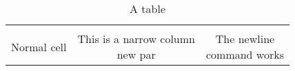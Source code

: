 \documentclass[10pt, a4paper]{article}
\begin{document}
\setcounter{table}{10}
\begin{table}\center

\begin{tabular}{|c|c|c|}
	\hline
	&& \\
	Normal cell & {\parbox[t]{1cm}{This is a narrow column\\new par}} & \parbox[t]{4cm}{The newline \\ command works} \\
	\hline
\end{tabular}
{\caption{A table}}
\end{table}
\end{document}
